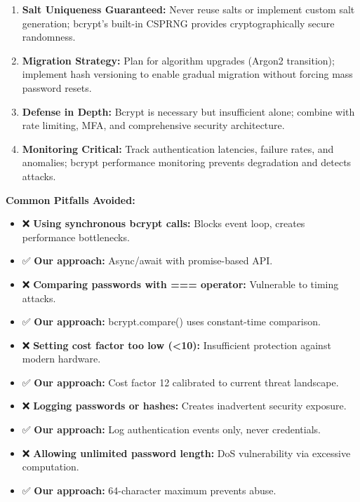 \documentclass[12pt,a4paper]{article}
\begin{document}
\begin{tcolorbox}[colback=primaryblue!5, colframe=primaryblue, boxrule=1pt, arc=3pt, left=10pt, right=10pt, top=8pt, bottom=8pt]
\begin{enumerate}[leftmargin=2em, itemsep=6pt]
    \item \textbf{Salt Uniqueness Guaranteed:} Never reuse salts or implement custom salt generation; bcrypt's built-in CSPRNG provides cryptographically secure randomness.
    
    \item \textbf{Migration Strategy:} Plan for algorithm upgrades (Argon2 transition); implement hash versioning to enable gradual migration without forcing mass password resets.
    
    \item \textbf{Defense in Depth:} Bcrypt is necessary but insufficient alone; combine with rate limiting, MFA, and comprehensive security architecture.
    
    \item \textbf{Monitoring Critical:} Track authentication latencies, failure rates, and anomalies; bcrypt performance monitoring prevents degradation and detects attacks.
\end{enumerate}

\vspace{0.5em}

\textbf{Common Pitfalls Avoided:}

\begin{itemize}[leftmargin=2em, itemsep=6pt]
    \item ❌ \textbf{Using synchronous bcrypt calls:} Blocks event loop, creates performance bottlenecks.
    \item ✅ \textbf{Our approach:} Async/await with promise-based API.
    
    \item ❌ \textbf{Comparing passwords with === operator:} Vulnerable to timing attacks.
    \item ✅ \textbf{Our approach:} bcrypt.compare() uses constant-time comparison.
    
    \item ❌ \textbf{Setting cost factor too low (<10):} Insufficient protection against modern hardware.
    \item ✅ \textbf{Our approach:} Cost factor 12 calibrated to current threat landscape.
    
    \item ❌ \textbf{Logging passwords or hashes:} Creates inadvertent security exposure.
    \item ✅ \textbf{Our approach:} Log authentication events only, never credentials.
    
    \item ❌ \textbf{Allowing unlimited password length:} DoS vulnerability via excessive computation.
    \item ✅ \textbf{Our approach:} 64-character maximum prevents abuse.
\end{itemize}

\end{tcolorbox}
\end{document}
